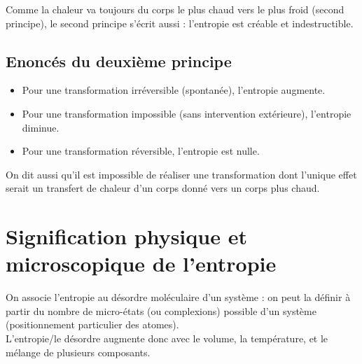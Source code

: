 \documentclass[13pt, twoside, a4paper, french]{report}
\begin{document}

                Comme la chaleur va toujours du corps le plus chaud vers le plus froid (second principe), le second principe s'écrit aussi :
                l'entropie est créable et indestructible.

            \subsection{Enoncés du deuxième principe}

                \begin{itemize}
                    \item Pour une transformation irréversible (spontanée), l'entropie augmente.
                    \item Pour une transformation impossible (sans intervention extérieure), l'entropie diminue.
                    \item Pour une transformation réversible, l'entropie est nulle.\vspace{5pt}
                \end{itemize}
                On dit aussi qu'il est impossible de réaliser une transformation dont l'unique effet serait un transfert de chaleur d'un corps donné vers un corps plus chaud.

        \section{Signification physique et microscopique de l’entropie}

            On associe l'entropie au désordre moléculaire d'un système : on peut la définir à partir du nombre de micro-états (ou complexions) possible d'un système (positionnement particulier des atomes).\\
            L'entropie/le désordre augmente donc avec le volume, la température, et le mélange de plusieurs composants.\\
\end{document}
